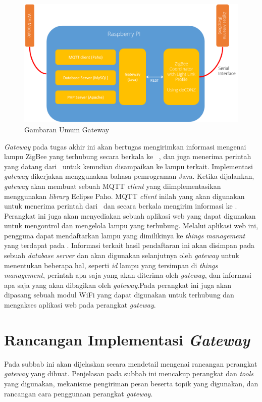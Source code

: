 \begin{figure}
	\centering
	\includegraphics[width=.9\textwidth]{pics/rancangan-gateway.PNG}
	\caption{Gambaran Umum Gateway}
	\label{fig:rancangan-gateway}
\end{figure} 

\textit{Gateway} pada tugas akhir ini akan bertugas mengirimkan informasi mengenai lampu ZigBee yang terhubung secara berkala ke \plat~, dan juga menerima perintah yang datang dari \plat~untuk kemudian disampaikan ke lampu terkait. Implementasi \textit{gateway} dikerjakan menggunakan bahasa pemrograman Java. Ketika dijalankan, \textit{gateway} akan membuat sebuah MQTT \textit{client} yang diimplementasikan menggunakan \textit{library} Eclipse Paho. MQTT \textit{client} inilah yang akan digunakan untuk menerima perintah dari \plat~dan secara berkala mengirim informasi ke \plat. Perangkat ini juga akan menyediakan sebuah aplikasi web yang dapat digunakan untuk mengontrol dan mengelola lampu yang terhubung. Melalui aplikasi web ini, pengguna dapat mendaftarkan lampu yang dimilikinya ke \textit{things management} yang terdapat pada \plat. Informasi terkait hasil pendaftaran ini akan disimpan pada sebuah \textit{database server} dan akan digunakan selanjutnya oleh \textit{gateway} untuk menentukan beberapa hal, seperti \textit{id} lampu yang tersimpan di \textit{things management}, perintah apa saja yang akan diterima oleh \textit{gateway}, dan informasi apa saja yang akan dibagikan oleh \textit{gateway}.Pada perangkat ini juga akan dipasang sebuah modul WiFi yang dapat digunakan untuk terhubung dan mengakses aplikasi web pada perangkat \textit{gateway}.

\section{Rancangan Implementasi \textit{Gateway}}
Pada subbab ini akan dijelaskan secara mendetail mengenai rancangan perangkat \textit{gateway} yang dibuat. Penjelasan pada subbab ini mencakup perangkat dan \textit{tools} yang digunakan, mekanisme pengiriman pesan beserta topik yang digunakan, dan rancangan cara penggunaan perangkat \textit{gateway}.

